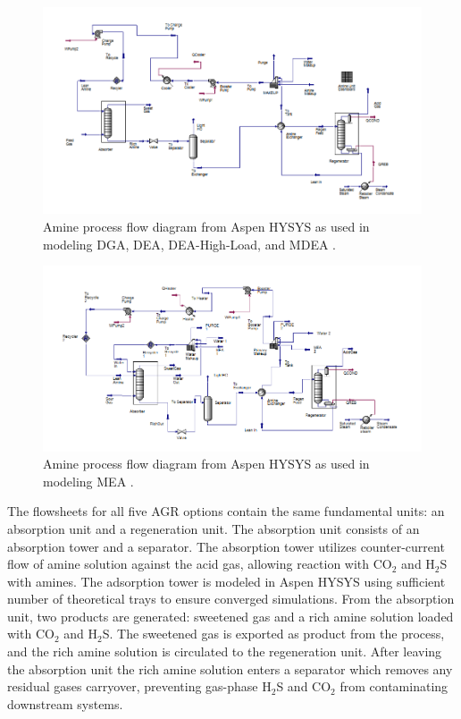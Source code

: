 \documentclass[11pt]{report}
\begin{document}
\begin{figure}
\includegraphics[width=1.2\columnwidth]{images/Aspen_AGR_General.png}
\caption{Amine process flow diagram from Aspen HYSYS as used in modeling DGA, DEA, DEA-High-Load, and MDEA \cite{Aspentech2016}.}
\label{fig:Aspen_AGR_General}
\end{figure}

\begin{figure}
\includegraphics[width=1.2\columnwidth]{images/Aspen_AGR_MEA.png}
\caption{Amine process flow diagram from Aspen HYSYS as used in modeling MEA \cite{Aspentech2016}.}
\label{fig:Aspen_AGR_MEA}
\end{figure}

The flowsheets for all five AGR options contain the same fundamental units: an absorption unit and a regeneration unit. The absorption unit consists of an absorption tower and a separator. The absorption tower utilizes counter-current flow of amine solution against the acid gas, allowing reaction with CO$_2$ and H$_2$S with amines. The adsorption tower is modeled in Aspen HYSYS using sufficient number of theoretical trays to ensure converged simulations. From the absorption unit, two products are generated: sweetened gas and a rich amine solution loaded with CO$_2$ and H$_2$S. The sweetened gas is exported as product from the process, and the rich amine solution is circulated to the regeneration unit. After leaving the absorption unit the rich amine solution enters a separator which removes any residual gases carryover, preventing gas-phase H$_2$S and CO$_2$ from contaminating downstream systems.
\end{document}
